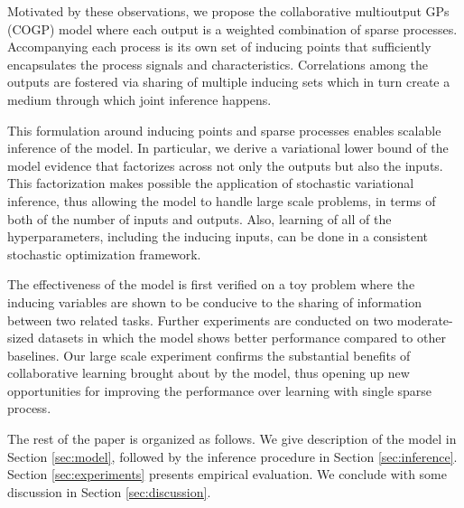 Motivated by these observations, we propose the collaborative multioutput GPs (COGP) model where each output is a weighted combination of sparse processes. 
Accompanying each process is its own set of inducing points that sufficiently encapsulates the process signals and characteristics.
Correlations among the outputs are fostered via sharing of multiple inducing sets which in turn create a medium through which joint inference happens.

This formulation around inducing points and sparse processes enables scalable inference of the model.
In particular, we derive a variational lower bound of the model evidence that factorizes across not only the outputs but also the inputs.
This factorization makes possible the application of stochastic variational inference, thus allowing the model to handle large scale problems, in terms of both of the number of inputs and outputs.
Also, learning of all of the  hyperparameters, including the inducing inputs, can be done in a consistent stochastic optimization framework.

The effectiveness of the model is first verified on a toy problem where the inducing variables are shown to be conducive to the sharing of information between two related tasks. 
Further experiments are conducted on two moderate-sized datasets in which the model shows better performance compared to other baselines.
Our large scale experiment confirms the substantial benefits of collaborative learning brought about by the model, 
thus opening up new opportunities for improving the performance over learning with single sparse process. 
  
The rest of the paper is organized as follows.
We give description of the model in Section \ref{sec:model}, followed by the inference procedure in Section \ref{sec:inference}. 
Section \ref{sec:experiments} presents empirical evaluation.
We conclude with some discussion in Section \ref{sec:discussion}.

